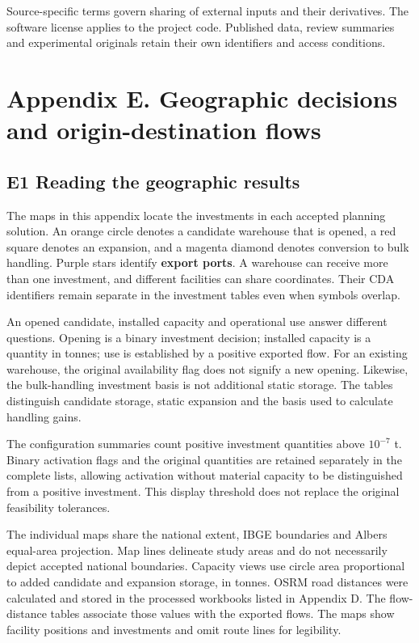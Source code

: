 \documentclass[
  english,
  11pt,
  a4paper,
]{article}
\begin{document}
Source-specific terms govern sharing of external inputs and their
derivatives. The software license applies to the project code. Published
data, review summaries and experimental originals retain their own
identifiers and access conditions.

\newpage{}

\section{Appendix E. Geographic decisions and origin-destination
flows}\label{appendix-e.-geographic-decisions-and-origin-destination-flows}

\subsection{E1 Reading the geographic
results}\label{e1-reading-the-geographic-results}

The maps in this appendix locate the investments in each accepted
planning solution. An orange circle denotes a candidate warehouse that
is opened, a red square denotes an expansion, and a magenta diamond
denotes conversion to bulk handling. Purple stars identify
\textbf{export ports}. A warehouse can receive more than one investment,
and different facilities can share coordinates. Their CDA identifiers
remain separate in the investment tables even when symbols overlap.

An opened candidate, installed capacity and operational use answer
different questions. Opening is a binary investment decision; installed
capacity is a quantity in tonnes; use is established by a positive
exported flow. For an existing warehouse, the original availability flag
does not signify a new opening. Likewise, the bulk-handling investment
basis is not additional static storage. The tables distinguish candidate
storage, static expansion and the basis used to calculate handling
gains.

The configuration summaries count positive investment quantities above
\(10^{-7}\) t. Binary activation flags and the original quantities are
retained separately in the complete lists, allowing activation without
material capacity to be distinguished from a positive investment. This
display threshold does not replace the original feasibility tolerances.

The individual maps share the national extent, IBGE boundaries and
Albers equal-area projection. Map lines delineate study areas and do not
necessarily depict accepted national boundaries. Capacity views use
circle area proportional to added candidate and expansion storage, in
tonnes. OSRM road distances were calculated and stored in the processed
workbooks listed in Appendix D. The flow-distance tables associate those
values with the exported flows. The maps show facility positions and
investments and omit route lines for legibility.
\end{document}
